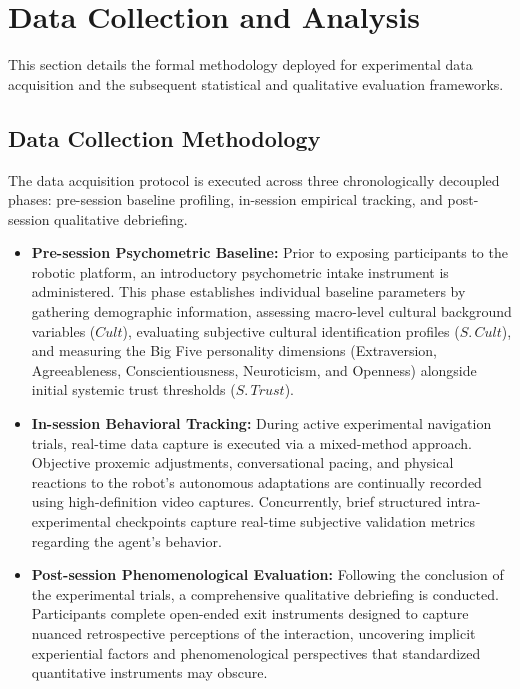 \section{Data Collection and Analysis}
This section details the formal methodology deployed for experimental data acquisition and the subsequent statistical and qualitative evaluation frameworks. 

\subsection{Data Collection Methodology}
The data acquisition protocol is executed across three chronologically decoupled phases: pre-session baseline profiling, in-session empirical tracking, and post-session qualitative debriefing.

\begin{itemize}
    \item \textbf{Pre-session Psychometric Baseline:} Prior to exposing participants to the robotic platform, an introductory psychometric intake instrument is administered. This phase establishes individual baseline parameters by gathering demographic information, assessing macro-level cultural background variables ($\mathit{Cult}$), evaluating subjective cultural identification profiles ($\mathit{S.\,Cult}$), and measuring the Big Five personality dimensions (Extraversion, Agreeableness, Conscientiousness, Neuroticism, and Openness) alongside initial systemic trust thresholds ($\mathit{S.\,Trust}$).
    
    \item \textbf{In-session Behavioral Tracking:} During active experimental navigation trials, real-time data capture is executed via a mixed-method approach. Objective proxemic adjustments, conversational pacing, and physical reactions to the robot’s autonomous adaptations are continually recorded using high-definition video captures. Concurrently, brief structured intra-experimental checkpoints capture real-time subjective validation metrics regarding the agent's behavior.
    
    \item \textbf{Post-session Phenomenological Evaluation:} Following the conclusion of the experimental trials, a comprehensive qualitative debriefing is conducted. Participants complete open-ended exit instruments designed to capture nuanced retrospective perceptions of the interaction, uncovering implicit experiential factors and phenomenological perspectives that standardized quantitative instruments may obscure.
\end{itemize}

